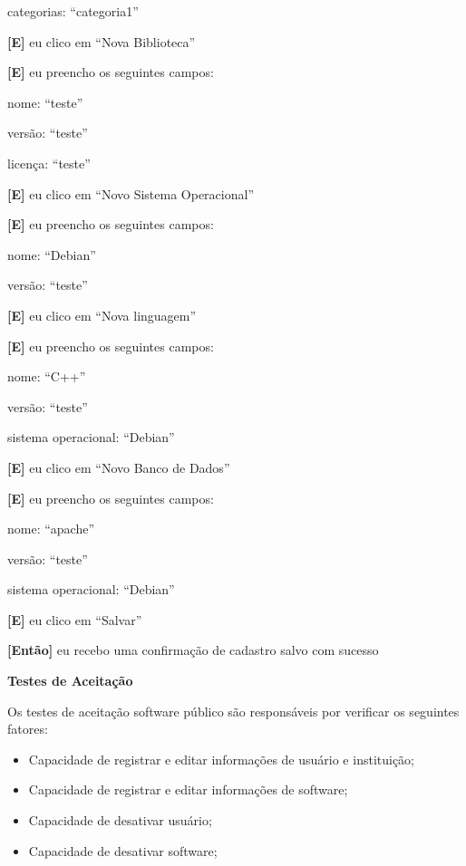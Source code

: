 \begin{itemize}
  		\subitem categorias: ``categoria1''
 	
 	\textbf{[E]} eu clico em ``Nova Biblioteca''

 	\textbf{[E]} eu preencho os seguintes campos: 

 		\subitem nome: ``teste''

 		\subitem versão: ``teste''

 		\subitem licença: ``teste''

 	\textbf{[E]} eu clico em ``Novo Sistema Operacional''

 	\textbf{[E]} eu preencho os seguintes campos: 

 		\subitem nome: ``Debian''

 		\subitem versão: ``teste''

 	\textbf{[E]} eu clico em ``Nova linguagem''

 	\textbf{[E]} eu preencho os seguintes campos: 

 		\subitem nome: ``C++''

 		\subitem versão: ``teste''

 		\subitem sistema operacional: ``Debian''

 	\textbf{[E]} eu clico em ``Novo Banco de Dados''

 	\textbf{[E]} eu preencho os seguintes campos: 

 		\subitem nome: ``apache''

 		\subitem versão: ``teste''

 		\subitem sistema operacional: ``Debian''

	\textbf{[E]} eu clico em ``Salvar''

	\textbf{[Então]} eu recebo uma confirmação de cadastro salvo com sucesso
	
	
\end{itemize}



\textbf{Testes de Aceitação}

Os testes de aceitação software público são responsáveis por verificar os seguintes fatores:

\begin{itemize}
	\item Capacidade de registrar e editar informações de usuário e instituição;
	\item Capacidade de registrar e editar informações de software;
	\item Capacidade de desativar usuário;
	\item Capacidade de desativar software;
\end{itemize}


